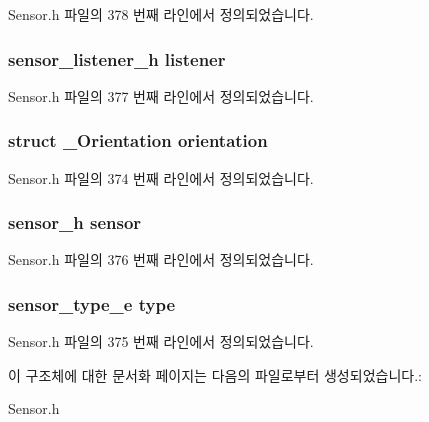Sensor.\-h 파일의 378 번째 라인에서 정의되었습니다.

\hypertarget{struct__OrientationExtend_aa977dfb866b24fd7d9a20a9a01b2fd1f}{
\subsubsection[{listener}]{\setlength{\rightskip}{0pt plus 5cm}sensor\-\_\-listener\-\_\-h listener}}\label{struct__OrientationExtend_aa977dfb866b24fd7d9a20a9a01b2fd1f}


Sensor.\-h 파일의 377 번째 라인에서 정의되었습니다.

\hypertarget{struct__OrientationExtend_ad28b7e9f0c184d60aba7731570671894}{
\subsubsection[{orientation}]{\setlength{\rightskip}{0pt plus 5cm}struct {\bf \-\_\-\-Orientation} orientation}}\label{struct__OrientationExtend_ad28b7e9f0c184d60aba7731570671894}


Sensor.\-h 파일의 374 번째 라인에서 정의되었습니다.

\hypertarget{struct__OrientationExtend_a5bae9b7801bc3808411925cde81d3f26}{
\subsubsection[{sensor}]{\setlength{\rightskip}{0pt plus 5cm}sensor\-\_\-h sensor}}\label{struct__OrientationExtend_a5bae9b7801bc3808411925cde81d3f26}


Sensor.\-h 파일의 376 번째 라인에서 정의되었습니다.

\hypertarget{struct__OrientationExtend_abffb09766da2fc510a79bb51f82a36e1}{
\subsubsection[{type}]{\setlength{\rightskip}{0pt plus 5cm}sensor\-\_\-type\-\_\-e type}}\label{struct__OrientationExtend_abffb09766da2fc510a79bb51f82a36e1}


Sensor.\-h 파일의 375 번째 라인에서 정의되었습니다.



이 구조체에 대한 문서화 페이지는 다음의 파일로부터 생성되었습니다.\-:\begin{DoxyCompactItemize}
\item 
Sensor.\-h\end{DoxyCompactItemize}
